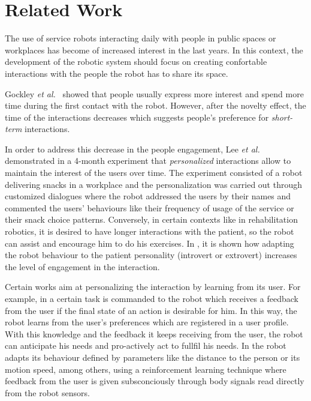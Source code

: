 \section{Related Work}
\vspace{-0.1cm}

The use of service robots interacting daily with people in public
spaces or workplaces has become of increased interest in the last
years.
In this context, the development of the robotic system should focus on
creating confortable interactions with the people the robot has to
share its space.

Gockley \textit{et al.}~\cite{gockley2005} showed that people usually
express more interest and spend more time during the first contact
with the robot. However, after the novelty effect, the time of the
interactions decreases which suggests people's preference for
\textit{short-term} interactions.

In order to address this decrease in the people engagement, Lee
\textit{et al.}~\cite{Lee2012} demonstrated in a 4-month experiment
that \textit{personalized} interactions allow to maintain the interest of the
users over time.  The experiment consisted of a robot delivering
snacks in a workplace and the personalization was carried out through
customized dialogues where the robot addressed the users by their
names and commented the users' behaviours like their frequency of
usage of the service or their snack choice patterns.
Conversely, in certain contexts like in rehabilitation robotics, it is
desired to have longer interactions with the patient, so the robot can
assist and encourage him to do his exercises. In \cite{tapus2008}, it
is shown how adapting the robot behaviour to the patient personality
(introvert or extrovert) increases the level of engagement in the
interaction.

Certain works aim at personalizing the interaction by learning from its
user. For example, in \cite{mason2011robot} a certain task is
commanded to the robot which receives a feedback from the user if the
final state of an action is desirable for him.  In this way, the robot
learns from the user's preferences which are registered in a user
profile. With this knowledge and the feedback it keeps receiving from
the user, the robot can anticipate his needs and pro-actively act to
fullfil his needs.  In \cite{mitsunaga2008adapting} the robot adapts
its behaviour defined by parameters like the distance to the person or
its motion speed, among others, using a reinforcement learning technique
where feedback from the user is given subsconciously through body
signals read directly from the robot sensors.

